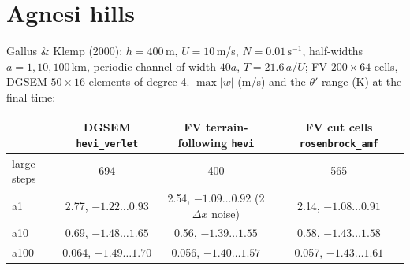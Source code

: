\documentclass[11pt,a4paper]{article}
\newcommand{\code}[1]{\texttt{#1}}
\begin{document}
\section{Agnesi hills}

Gallus \& Klemp (2000): $h = 400$\,m, $U = 10$\,m/s, $N = 0.01\,\mathrm{s}^{-1}$, half-widths
$a = 1, 10, 100$\,km, periodic channel of width $40a$, $T = 21.6\,a/U$; FV $200\times64$ cells, DGSEM
$50\times16$ elements of degree 4. $\max|w|$ (m/s) and the $\theta'$ range (K) at the final time:

\begin{center}
\small\begin{tabular}{lccc}
\toprule
 & DGSEM \code{hevi\_verlet} & FV terrain-following \code{hevi} & FV cut cells \code{rosenbrock\_amf}\\
\midrule
large steps & 694 & 400 & 565\\
a1   & 2.77, $-1.22\ldots0.93$ & 2.54, $-1.09\ldots0.92$ (2$\Delta x$ noise) & 2.14, $-1.08\ldots0.91$\\
a10  & 0.69, $-1.48\ldots1.65$ & 0.56, $-1.39\ldots1.55$ & 0.58, $-1.43\ldots1.58$\\
a100 & 0.064, $-1.49\ldots1.70$ & 0.056, $-1.40\ldots1.57$ & 0.057, $-1.43\ldots1.61$\\
\bottomrule
\end{tabular}
\end{center}
\end{document}
